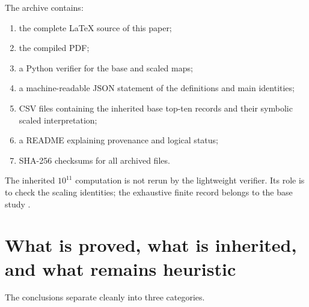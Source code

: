 \documentclass[11pt]{article}
\begin{document}
The archive contains:
\begin{enumerate}[label=(\arabic*)]
\item the complete \LaTeX{} source of this paper;
\item the compiled PDF;
\item a Python verifier for the base and scaled maps;
\item a machine-readable JSON statement of the definitions and main identities;
\item CSV files containing the inherited base top-ten records and their symbolic scaled interpretation;
\item a README explaining provenance and logical status;
\item SHA-256 checksums for all archived files.
\end{enumerate}
The inherited $10^{11}$ computation is not rerun by the lightweight verifier. Its role is to check the scaling identities; the exhaustive finite record belongs to the base study \cite{Base7Paper}.

\section{What is proved, what is inherited, and what remains heuristic}
The conclusions separate cleanly into three categories.
\end{document}
